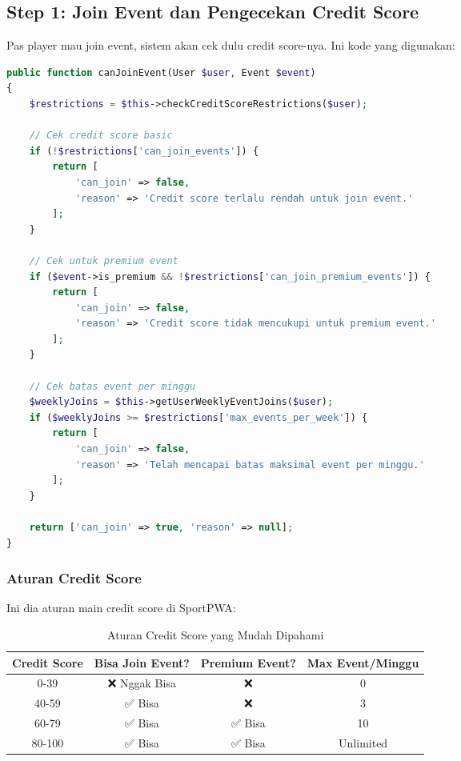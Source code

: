\documentclass[12pt]{article}
\begin{document}
\subsection{Step 1: Join Event dan Pengecekan Credit Score}

Pas player mau join event, sistem akan cek dulu credit score-nya. Ini kode yang digunakan:

\begin{lstlisting}[language=PHP, caption=Pengecekan Join Event di CreditScoreService.php]
public function canJoinEvent(User $user, Event $event)
{
    $restrictions = $this->checkCreditScoreRestrictions($user);
    
    // Cek credit score basic
    if (!$restrictions['can_join_events']) {
        return [
            'can_join' => false,
            'reason' => 'Credit score terlalu rendah untuk join event.'
        ];
    }

    // Cek untuk premium event
    if ($event->is_premium && !$restrictions['can_join_premium_events']) {
        return [
            'can_join' => false,
            'reason' => 'Credit score tidak mencukupi untuk premium event.'
        ];
    }

    // Cek batas event per minggu
    $weeklyJoins = $this->getUserWeeklyEventJoins($user);
    if ($weeklyJoins >= $restrictions['max_events_per_week']) {
        return [
            'can_join' => false,
            'reason' => 'Telah mencapai batas maksimal event per minggu.'
        ];
    }

    return ['can_join' => true, 'reason' => null];
}
\end{lstlisting}

\subsubsection{Aturan Credit Score}
Ini dia aturan main credit score di SportPWA:

\begin{table}[H]
\centering
\begin{tabular}{|c|c|c|c|}
\hline
\textbf{Credit Score} & \textbf{Bisa Join Event?} & \textbf{Premium Event?} & \textbf{Max Event/Minggu} \\
\hline
0-39 & ❌ Nggak Bisa & ❌ & 0 \\
40-59 & ✅ Bisa & ❌ & 3 \\
60-79 & ✅ Bisa & ✅ Bisa & 10 \\
80-100 & ✅ Bisa & ✅ Bisa & Unlimited \\
\hline
\end{tabular}
\caption{Aturan Credit Score yang Mudah Dipahami}
\end{table}
\end{document}
